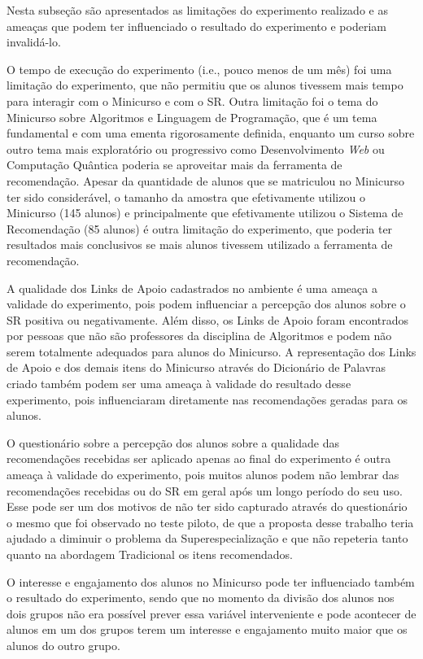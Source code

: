 Nesta subseção são apresentados as limitações do experimento realizado e as ameaças que podem ter influenciado o resultado
do experimento e poderiam invalidá-lo.

O tempo de execução do experimento (i.e., pouco menos de um mês) foi uma limitação do experimento, que não permitiu que
os alunos tivessem mais tempo para interagir com o Minicurso e com o SR. Outra limitação foi o tema do Minicurso sobre
Algoritmos e Linguagem de Programação, que é um tema fundamental e com uma ementa rigorosamente definida, enquanto um curso
sobre outro tema mais exploratório ou progressivo como Desenvolvimento \textit{Web} ou Computação Quântica poderia se aproveitar
mais da ferramenta de recomendação. Apesar da quantidade de alunos que se matriculou no Minicurso ter sido considerável,
o tamanho da amostra que efetivamente utilizou o Minicurso (145 alunos) e principalmente que efetivamente utilizou o Sistema de
Recomendação (85 alunos) é outra limitação do experimento, que poderia ter resultados mais conclusivos se mais alunos tivessem
utilizado a ferramenta de recomendação.

A qualidade dos Links de Apoio cadastrados no ambiente \adaptwebspace é uma ameaça a validade do experimento, pois podem
influenciar a percepção dos alunos sobre o SR positiva ou negativamente. Além disso, os Links de Apoio foram encontrados
por pessoas que não são professores da disciplina de Algoritmos e podem não serem totalmente adequados para alunos do Minicurso.
A representação dos Links de Apoio e dos demais itens do Minicurso através do Dicionário de Palavras criado também
podem ser uma ameaça à validade do resultado desse experimento, pois influenciaram diretamente nas recomendações geradas
para os alunos.

O questionário sobre a percepção dos alunos sobre a qualidade das recomendações recebidas ser aplicado apenas ao final
do experimento é outra ameaça à validade do experimento, pois muitos alunos podem não lembrar das recomendações recebidas
ou do SR em geral após um longo período do seu uso. Esse pode ser um dos motivos de não ter sido capturado através do
questionário o mesmo que foi observado no teste piloto, de que a proposta desse trabalho teria ajudado a diminuir o
problema da Superespecialização e que não repeteria tanto quanto na abordagem Tradicional os itens recomendados.

O interesse e engajamento dos alunos no Minicurso pode ter influenciado também o resultado do experimento, sendo que no momento
da divisão dos alunos nos dois grupos não era possível prever essa variável interveniente e pode acontecer de alunos em
um dos grupos terem um interesse e engajamento muito maior que os alunos do outro grupo.

